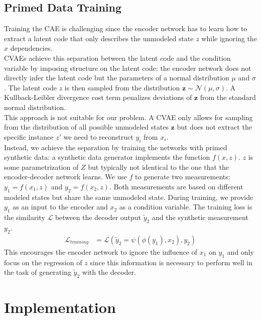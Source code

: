 \documentclass[letterpaper, 10 pt, journal, twoside]{ieeetran}  %
\begin{document}
\subsection{Primed Data Training}
Training the CAE is challenging since the encoder network has to learn how to extract a latent code that only describes the unmodeled state $z$ while ignoring the $x$ dependencies.\\
CVAEs achieve this separation between the latent code and the condition variable by imposing structure on the latent code: the encoder network does not directly infer the latent code but the parameters of a normal distribution $\mu$ and $\sigma$. The latent code $z$ is then sampled from the distribution $\bm{z} \sim \mathcal{N}(\mu, \sigma)$. A Kullback-Leibler divergence cost term penalizes deviations of $\bm{z}$ from the standard normal distribution.\\
This approach is not suitable for our problem. A CVAE only allows for sampling from the distribution of all possible unmodeled states $\bm{z}$ but does not extract the specific instance $z'$ we need to reconstruct $y_i$ from $x_i$.\\
Instead, we achieve the separation by training the networks with primed synthetic data: a synthetic data generator implements the function $f(x, \textit{z})$. $\textit{z}$ is some parametrization of $Z$ but typically not identical to the one that the encoder-decoder network learns. We use $f$ to generate two measurements: $y_1 = f(x_1, \textit{z})$ and $y_2 = f(x_2, \textit{z})$.
Both measurements are based on different modeled states but share the same unmodeled state. During training, we provide $y_1$ as an input to the encoder and $x_2$ as a condition variable. The training loss is the similarity $\mathcal{L}$ between the decoder output $\tilde{y}_2$ and the synthetic measurement $y_2$.
\begin{align}
    \mathcal{L}_{training} &= \mathcal{L}(\tilde{y}_2 = \psi(\phi(y_1), x_2), y_2)
    \label{eqn:training_loss}
\end{align}
This encourages the encoder network to ignore the influence of $x_1$ on $y_1$ and only focus on the regression of $\textit{z}$ since this information is necessary to perform well in the task of generating $\tilde{y}_2$ with the decoder.
\section{Implementation}
\label{sec:implementation}
\end{document}
